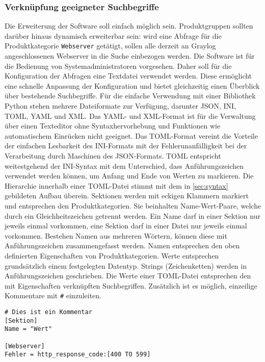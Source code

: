 \subsubsection{Verknüpfung geeigneter Suchbegriffe}

Die Erweiterung der Software soll einfach möglich sein. Produktgruppen sollten darüber hinaus dynamisch erweiterbar sein: wird eine Abfrage für die Produktkategorie \lstinline{Webserver} getätigt, sollen alle derzeit an Graylog angeschlossenen Webserver in die Suche einbezogen werden. Die Software ist für die Bedienung von Systemadministratoren vorgesehen. Daher soll für die Konfiguration der Abfragen eine Textdatei verwendet werden. Diese ermöglicht eine schnelle Anpassung der Konfiguration und bietet gleichzeitig einen Überblick über bestehende Suchbegriffe. Für die einfache Verwendung mit einer Bibliothek Python stehen mehrere Dateiformate zur Verfügung, darunter JSON, INI, TOML, YAML und XML. Das YAML- und XML-Format ist für die Verwaltung über einen Texteditor ohne Syntaxhervorhebung und Funktionen wie automatischem Einrücken nicht geeignet. Das TOML-Format vereint die Vorteile der einfachen Lesbarkeit des INI-Formats mit der Fehlerunanfälligkeit bei der Verarbeitung durch Maschinen des JSON-Formats. TOML entspricht weitestgehend der INI-Syntax mit dem Unterschied, dass Anführungszeichen verwendet werden können, um Anfang und Ende von Werten zu markieren. Die Hierarchie innerhalb einer TOML-Datei stimmt mit dem in \autoref{sec:syntax} gebildeten Aufbau überein. Sektionen werden mit eckigen Klammern markiert und entsprechen den Produktkategorien. Sie beinhalten Name-Wert-Paare, welche durch ein Gleichheitszeichen getrennt werden. Ein Name darf in einer Sektion nur jeweils einmal vorkommen, eine Sektion darf in einer Datei nur jeweils einmal vorkommen. Bestehen Namen aus mehreren Wörtern, können diese mit Anführungszeichen zusammengefasst werden. Namen entsprechen den oben definierten Eigenschaften von Produktkategorien. Werte entsprechen grundsätzlich einem festgelegten Datentyp. Strings (Zeichenketten) werden in Anführungszeichen geschrieben. Die Werte einer TOML-Datei entsprechen den mit Eigenschaften verknüpften Suchbegriffen. Zusätzlich ist es möglich, einzeilige Kommentare mit \lstinline{#} einzuleiten.

\begin{lstlisting}[caption={Beispiel der TOML-Syntax.}, label=toml-syntax, xleftmargin=6mm]
# Dies ist ein Kommentar
[Sektion]
Name = "Wert"

[Webserver]
Fehler = http_response_code:[400 TO 599] 
\end{lstlisting}
